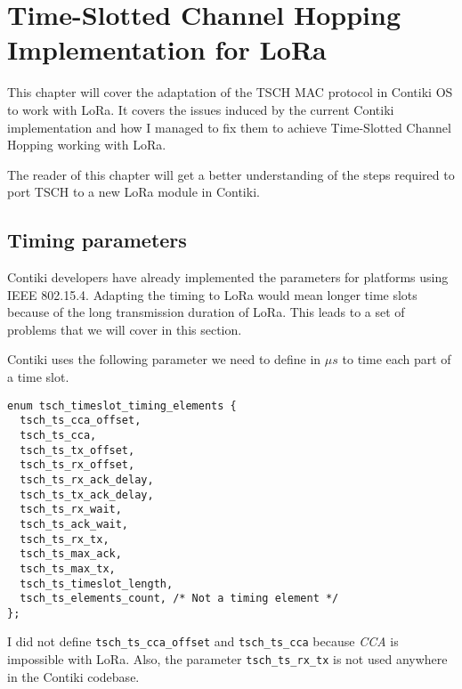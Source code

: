 \chapter{Time-Slotted Channel Hopping Implementation for LoRa\label{section:tsch}}

This chapter will cover the adaptation of the TSCH MAC protocol in Contiki OS to
work with LoRa.
It covers the issues induced by the current Contiki implementation and how I
managed to fix them to achieve Time-Slotted Channel Hopping working with LoRa.

The reader of this chapter will get a better understanding of the steps
required to port TSCH to a new LoRa module in Contiki.

\section{Timing parameters\label{section:timingparameters}}

Contiki developers have already implemented the parameters for
platforms using IEEE 802.15.4.
Adapting the timing to LoRa would mean longer time slots because of the long
transmission duration of LoRa.
This leads to a set of problems that we will cover in this
section.

Contiki uses the following parameter we need to define in $\mu s$ to time each
part of a time slot.


\begin{lstlisting}
enum tsch_timeslot_timing_elements {
  tsch_ts_cca_offset,
  tsch_ts_cca,
  tsch_ts_tx_offset,
  tsch_ts_rx_offset,
  tsch_ts_rx_ack_delay,
  tsch_ts_tx_ack_delay,
  tsch_ts_rx_wait,
  tsch_ts_ack_wait,
  tsch_ts_rx_tx,
  tsch_ts_max_ack,
  tsch_ts_max_tx,
  tsch_ts_timeslot_length,
  tsch_ts_elements_count, /* Not a timing element */
};
\end{lstlisting}

I did not define \lstinline{tsch_ts_cca_offset} and \lstinline{tsch_ts_cca} 
because \emph{CCA} is impossible with LoRa.
Also, the parameter \lstinline{tsch_ts_rx_tx} is not used anywhere in the 
Contiki codebase.

